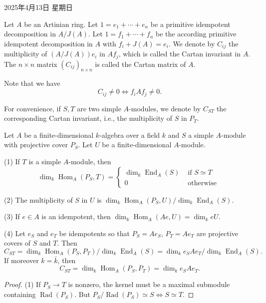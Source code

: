 \documentclass[11pt, a4paper]{report}
\begin{document}
2025年4月13日 星期日

\begin{definition}
Let $A$ be an Artinian ring. Let $1=e_{1}+\cdots+e_{n}$ be a primitive idempotent decomposition in $A / J(A)$. Let $1=f_{1}+\cdots+f_{n}$ be the according primitive idempotent decomposition in $A$ with $f_{i}+J(A)=e_{i}$. We denote by $C_{i j}$ the multiplicity of $(A / J(A)) e_{i}$ in $A f_{j}$, which is called the Cartan invariant in $A$. The $n \times n$ matrix $(C_{i j})_{n \times n}$ is called the Cartan matrix of $A$.

Note that we have
\[
C_{i j} \neq 0 \Leftrightarrow f_{i} A f_{j} \neq 0.
\]

For convenience, if $S, T$ are two simple $A$-modules, we denote by $C_{S T}$ the corresponding Cartan invariant, i.e., the multiplicity of $S$ in $P_{T}$.
\end{definition}

\begin{proposition}
Let $A$ be a finite-dimensional $k$-algebra over a field $k$ and $S$ a simple $A$-module with projective cover $P_{S}$. Let $U$ be a finite-dimensional $A$-module.

(1) If $T$ is a simple $A$-module, then
\[
\dim_{k} \operatorname{Hom}_{A}\left(P_{S}, T\right)= \begin{cases}\dim_{k} \operatorname{End}_{A}(S) & \text { if } S \simeq T \\ 0 & \text { otherwise }\end{cases}
\]

(2) The multiplicity of $S$ in $U$ is $\dim_{k}\operatorname{Hom}_{A}\left(P_{S}, U\right) / \dim_{k} \operatorname{End}_{A}(S)$.

(3) If $e \in A$ is an idempotent, then $\dim_{k} \operatorname{Hom}_{A}(Ae, U)=\dim_{k} eU$.

(4) Let $e_{S}$ and $e_{T}$ be idempotents so that $P_{S}=A e_{S}$, $P_{T}=A e_{T}$ are projective covers of $S$ and $T$. Then
\[
C_{ST}=\dim_{k} \operatorname{Hom}_{A}\left(P_{S}, P_{T}\right) / \dim_{k} \operatorname{End}_{A}(S)=\dim_{k} e_{S}Ae_{T} / \dim_{k} \operatorname{End}_{A}(S).
\]
If moreover $k=\bar{k}$, then
\[
C_{ST}=\dim_{k} \operatorname{Hom}_{A}\left(P_{S}, P_{T}\right)=\dim_{k} e_{S} A e_{T}.
\]

\end{proposition}

\begin{proof}
(1) If $P_{S} \rightarrow T$ is nonzero, the kernel must be a maximal submodule containing $\operatorname{Rad}\left(P_{S}\right)$. But $P_{S} / \operatorname{Rad}\left(P_{S}\right) \simeq S \Leftrightarrow S \simeq T$.

\end{proof}
\end{document}
